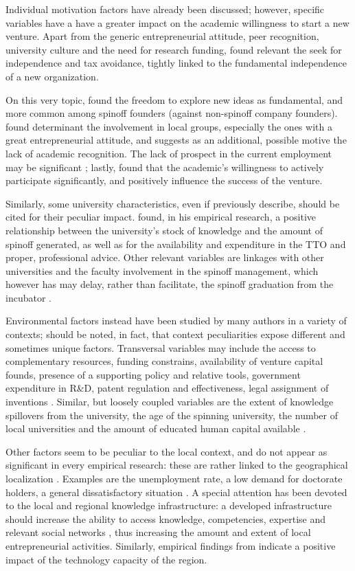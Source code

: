 Individual motivation factors have already been discussed; however, specific variables have a have a greater impact on the academic willingness to start a new venture. Apart from the generic entrepreneurial attitude, peer recognition, university culture and the need for research funding, \citet{Rizzo2015} found relevant the seek for independence and tax avoidance, tightly linked to the fundamental independence of a new organization. 

On this very topic, \citet{Perez2003} found the freedom to explore new ideas as fundamental, and more common among spinoff founders (against non-spinoff company founders). \citet{Siegel2007} found determinant the involvement in local groups, especially the ones with a great entrepreneurial attitude, and suggests as an additional, possible motive the lack of academic recognition. The lack of prospect in the current employment may be significant \citep{Rizzo2015}; lastly, \citet{Ittelson2002} found that the academic's willingness to actively participate significantly, and positively influence the success of the venture.

Similarly,  some university characteristics, even if previously describe, should be cited for their peculiar impact. \citet{Lockett2005a} found, in his empirical research, a positive relationship between the university's stock of knowledge and the amount of spinoff generated, as well as for the availability and expenditure in the TTO and proper, professional advice. Other relevant variables are linkages with other universities and the faculty involvement in the spinoff management, which however has may delay, rather than facilitate, the spinoff graduation from the incubator \citep{Rothaermel2005}.

Environmental factors instead have been studied by many authors in a variety of contexts; should be noted, in fact, that context peculiarities expose different and sometimes unique factors. Transversal variables may include the access to complementary resources, funding constrains, availability of venture capital founds, presence of a supporting policy and relative tools, government expenditure in R\&D, patent regulation and effectiveness, legal assignment of inventions \citep{OShea2004, Fini2009, Rizzo2015}. Similar, but loosely coupled variables are the extent of knowledge spillovers from the university, the age of the spinning university, the number of local universities and the amount of educated human capital available \citep{Audretsch2005}.

Other factors seem to be peculiar to the local context, and do not appear as significant in every empirical research: these are rather linked to the geographical localization \citep{OShea2004}. Examples are the unemployment rate, a low demand for doctorate holders, a general dissatisfactory situation \citep{Rizzo2015}. A special attention has been devoted to the local and regional knowledge infrastructure: a developed infrastructure should increase the ability to access knowledge, competencies, expertise and relevant social networks \citep{OShea2004}, thus increasing the amount and extent of local entrepreneurial activities. Similarly, empirical findings from \citet{Audretsch2005} indicate a positive impact of the technology capacity of the region.


